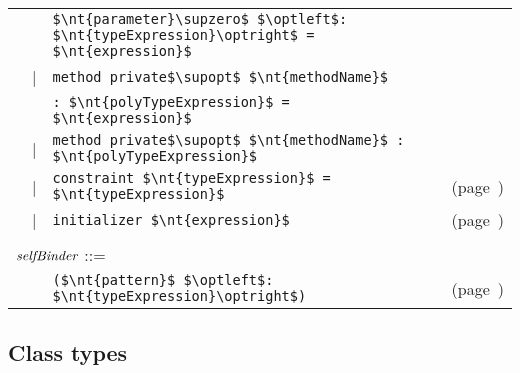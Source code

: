 \begin{center}
\begin{tabular}{rcll}
&   & \hbox{\lstinline/$\nt{parameter}\supzero$ $\optleft$: $\nt{typeExpression}\optright$ = $\nt{expression}$/}\\
& | & \hbox{\lstinline/method private$\supopt$ $\nt{methodName}$/}\\
&   & \hbox{\lstinline/: $\nt{polyTypeExpression}$ = $\nt{expression}$/}\\
& | & \hbox{\lstinline/method private$\supopt$ $\nt{methodName}$ : $\nt{polyTypeExpression}$/}\\
& | & \hbox{\lstinline/constraint $\nt{typeExpression}$ = $\nt{typeExpression}$/} & (page~\pageref{keyword:constraint})\\
& | & \hbox{\lstinline/initializer $\nt{expression}$/} & (page~\pageref{keyword:initializer})\\
\\
\multicolumn{3}{l}{$\textit{\rmfamily selfBinder}$ ::=}\\
&   & \hbox{\lstinline/($\nt{pattern}$ $\optleft$: $\nt{typeExpression}\optright$)/} & (page~\pageref{objects:self})
\end{tabular}
\end{center}

\subsection{Class types}

